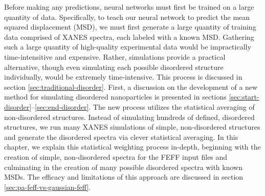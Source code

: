 
Before making any predictions, neural networks must first be trained on a large quantity of data. Specifically, to teach our neural network to predict the mean squared displacement (MSD), we must first generate a large quantity of training data comprised of XANES spectra, each labeled with a known MSD. Gathering such a large quantity of high-quality experimental data would be impractically time-intensitive and expensive. Rather, simulations provide a practical alternative, though even simulating each possible disordered structure individually, would be extremely time-intensive. This process is discussed in section \ref{sec:traditional-disorder}. First, a discussion on the development of a new method for simulating disordered nanoparticles is presented in sections \ref{sec:start-disorder}--\ref{sec:end-disorder}. The new process utilizes the statistical averaging of non-disordered structures. Instead of simulating hundreds of defined, disordered structures, we run many XANES simulations of simple, non-disordered structures and generate the disordered spectra via clever statistical averaging. In this chapter, we explain this statistical weighting process in-depth, beginning with the creation of simple, non-disordered spectra for the FEFF input files and culminating in the creation of many possible disordered spectra with known MSDs. The efficacy and limitations of this approach are discussed in section \ref{sec:pa-feff-vs-gaussian-feff}.

